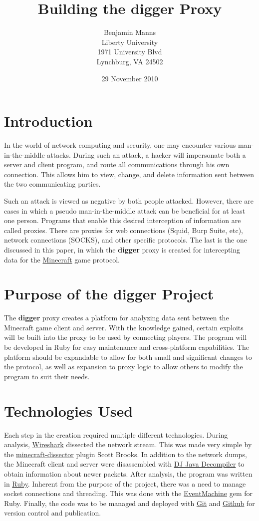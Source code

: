 \documentclass[12pt]{article}
\title{Building the \textbf{digger} Proxy}
\author{
  Benjamin Manns \\
  Liberty University \\
  1971 University Blvd \\
  Lynchburg, VA 24502
}
\date{29 November 2010}
\begin{document}
\maketitle

\section{Introduction}
In the world of network computing and security, one may encounter various man-in-the-middle attacks. During such an attack, a hacker will impersonate both a server and client program, and route all communications through his own connection. This allows him to view, change, and delete information sent between the two communicating parties.

Such an attack is viewed as negative by both people attacked. However, there are cases in which a pseudo man-in-the-middle attack can be beneficial for at least one person. Programs that enable this desired interception of information are called proxies. There are proxies for web connections (Squid, Burp Suite, etc), network connections (SOCKS), and other specific protocols. The last is the one discussed in this paper, in which the \textbf{digger} proxy is created for intercepting data for the \href{http://www.minecraft.net/}{Minecraft} game protocol.

\section{Purpose of the \textbf{digger} Project}
The \textbf{digger} proxy creates a platform for analyzing data sent between the Minecraft game client and server. With the knowledge gained, certain exploits will be built into the proxy to be used by connecting players. The program will be developed in Ruby for easy maintenance and cross-platform capabilities. The platform should be expandable to allow for both small and significant changes to the protocol, as well as expansion to proxy logic to allow others to modify the program to suit their needs.

\section{Technologies Used}
Each step in the creation required multiple different technologies. During analysis, \href{http://www.wireshark.org/}{Wireshark} dissected the network stream. This was made very simple by the \href{https://github.com/ScottBrooks/minecraft-dissector}{minecraft-dissector} plugin Scott Brooks. In addition to the network dumps, the Minecraft client and server were disassembled with \href{http://members.fortunecity.com/neshkov/dj.html}{DJ Java Decompiler} to obtain information about newer packets. After analysis, the program was written in \href{http://www.ruby-lang.org/en/}{Ruby}.  Inherent from the purpose of the project, there was a need to manage socket connections and threading. This was done with the \href{http://rubyeventmachine.com/}{EventMachine} gem for Ruby. Finally, the code was to be managed and deployed with \href{http://git-scm.com/}{Git} and \href{https://github.com/}{Github} for version control and publication.
\end{document}

